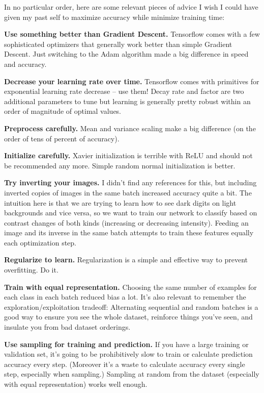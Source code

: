 \documentclass{article}
\begin{document}
In no particular order, here are some relevant pieces of advice I wish I could have given my past self to maximize accuracy while minimize training time:

\textbf{Use something better than Gradient Descent.} Tensorflow comes with a few sophisticated optimizers that generally work better than simple Gradient Descent. Just switching to the Adam algorithm made a big difference in speed and accuracy.

\textbf{Decrease your learning rate over time.} Tensorflow comes with primitives for exponential learning rate decrease -- use them! Decay rate and factor are two additional parameters to tune but learning is generally pretty robust within an order of magnitude of optimal values.

\textbf{Preprocess carefully.} Mean and variance scaling make a big difference (on the order of tens of percent of accuracy).

\textbf{Initialize carefully.} Xavier initialization is terrible with ReLU and should not be recommended any more. Simple random normal initialization is better.

\textbf{Try inverting your images.} I didn't find any references for this, but including inverted copies of images in the same batch increased accuracy quite a bit. The intuition here is that we are trying to learn how to see dark digits on light backgrounds and vice versa, so we want to train our network to classify based on contrast changes of both kinds (increasing or decreasing intensity). Feeding an image and its inverse in the same batch attempts to train these features equally each optimization step.

\textbf{Regularize to learn.} Regularization is a simple and effective way to prevent overfitting. Do it.

\textbf{Train with equal representation.} Choosing the same number of examples for each class in each batch reduced bias a lot.  It's also relevant to remember the exploration/exploitation tradeoff: Alternating sequential and random batches is a good way to ensure you see the whole dataset, reinforce things you've seen, and insulate you from bad dataset orderings.

\textbf{Use sampling for training and prediction.} If you have a large training or validation set, it's going to be prohibitively slow to train or calculate prediction accuracy every step. (Moreover it's a waste to calculate accuracy every single step, especially when sampling.) Sampling at random from the dataset (especially with equal representation) works well enough.
\end{document}
